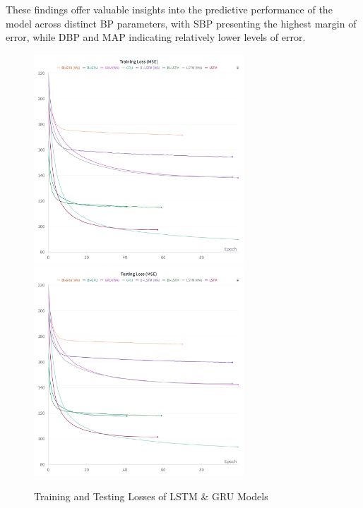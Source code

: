 These findings offer valuable insights into the predictive performance of the model across distinct BP parameters,
with SBP presenting the highest margin of error, while DBP and MAP indicating relatively lower levels of error.

\begin{figure}[p]
    \centering
    \begin{minipage}{\textwidth}
        \centering
        \includegraphics[width=0.7\textwidth]{images/results/training_loss_mse}
        \vspace{0.001cm}
        \includegraphics[width=0.7\textwidth]{images/results/testing_loss_mse}
        \captionsetup{format=plain, justification=centering, font=small}
        \caption{Training and Testing Losses of LSTM \& GRU Models}
        \label{fig:train_test_mse}
    \end{minipage}
\end{figure}

\newpage